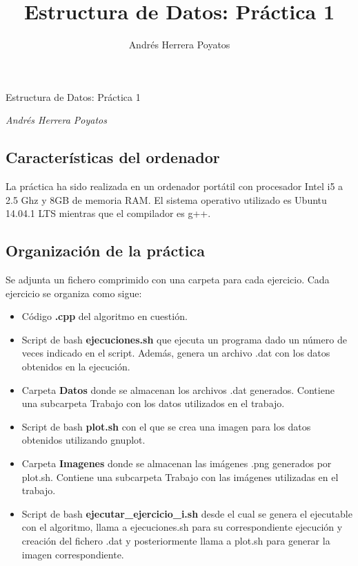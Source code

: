 \documentclass[]{article}
\title{Estructura de Datos: Práctica 1}
\author{Andrés Herrera Poyatos}
\date{}
\begin{document}
\begin{center}
\huge Estructura de Datos: Práctica 1 \\[0.2cm]
\end{center}
\begin{center}
\large \emph{Andrés Herrera Poyatos}\\[0.1cm]
\end{center}
\normalsize


\subsection{Características del
ordenador}\label{caracteristicas-del-ordenador}

La práctica ha sido realizada en un ordenador portátil con procesador
Intel i5 a 2.5 Ghz y 8GB de memoria RAM. El sistema operativo utilizado
es Ubuntu 14.04.1 LTS mientras que el compilador es g++.

\subsection{Organización de la
práctica}\label{organizacion-de-la-practica}

Se adjunta un fichero comprimido con una carpeta para cada ejercicio.
Cada ejercicio se organiza como sigue:

\begin{itemize}
\itemsep1pt\parskip0pt
\item
  Código \textbf{.cpp} del algoritmo en cuestión.
\item
  Script de bash \textbf{ejecuciones.sh} que ejecuta un programa dado un
  número de veces indicado en el script. Además, genera un archivo .dat
  con los datos obtenidos en la ejecución.
\item
  Carpeta \textbf{Datos} donde se almacenan los archivos .dat generados.
  Contiene una subcarpeta Trabajo con los datos utilizados en el
  trabajo.
\item
  Script de bash \textbf{plot.sh} con el que se crea una imagen para los
  datos obtenidos utilizando gnuplot.
\item
  Carpeta \textbf{Imagenes} donde se almacenan las imágenes .png
  generados por plot.sh. Contiene una subcarpeta Trabajo con las
  imágenes utilizadas en el trabajo.
\item
  Script de bash \textbf{ejecutar\_ejercicio\_i.sh} desde el cual se
  genera el ejecutable con el algoritmo, llama a ejecuciones.sh para su
  correspondiente ejecución y creación del fichero .dat y posteriormente
  llama a plot.sh para generar la imagen correspondiente.
\end{itemize}
\end{document}
